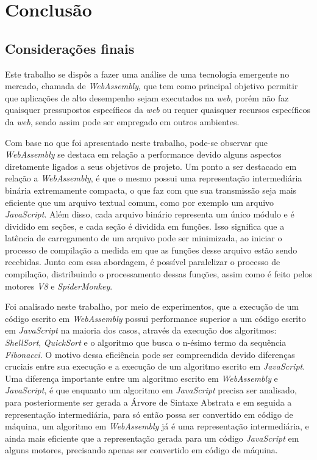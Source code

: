 \chapter{Conclusão}
\label{chap:conclusion}

\section{Considerações finais}
\label{ssec:final-considerations}

Este trabalho se dispôs a fazer uma análise de uma tecnologia emergente no mercado,
chamada de \textit{WebAssembly}, que tem como principal objetivo permitir que aplicações
de alto desempenho sejam executados na \textit{web}, porém não faz quaisquer pressupostos
específicos da \textit{web} ou requer quaisquer recursos específicos da \textit{web},
sendo assim pode ser empregado em outros ambientes.

Com base no que foi apresentado neste trabalho, pode-se observar que \textit{WebAssembly}
se destaca em relação a performance devido alguns aspectos diretamente ligados a seus
objetivos de projeto. Um ponto a ser destacado em relação a \textit{WebAssembly}, é que o
mesmo possui uma representação intermediária binária extremamente compacta, o que faz com
que sua transmissão seja mais eficiente que um arquivo textual comum, como por exemplo um
arquivo \textit{JavaScript}. Além disso, cada arquivo binário representa um único módulo
e é dividido em seções, e cada seção é dividida em funções. Isso significa que a latência
de carregamento de um arquivo pode ser minimizada, ao iniciar o processo de compilação a
medida em que as funções desse arquivo estão sendo recebidas. Junto com essa abordagem,
é possível paralelizar o processo de compilação, distribuindo o processamento dessas
funções, assim como é feito pelos motores \textit{V8} e \textit{SpiderMonkey}.

Foi analisado neste trabalho, por meio de experimentos, que a execução de um código
escrito em \textit{WebAssembly} possui performance superior a um código escrito em
\textit{JavaScript} na maioria dos casos, através da execução dos algoritmos:
\textit{ShellSort}, \textit{QuickSort} e o algoritmo que busca o n-ésimo termo da
sequência \textit{Fibonacci}. O motivo dessa eficiência pode ser compreendida devido
diferenças cruciais entre sua execução e a execução de um algoritmo escrito em
\textit{JavaScript}. Uma diferença importante entre um algoritmo escrito em
\textit{WebAssembly} e \textit{JavaScript}, é que enquanto um algoritmo em
\textit{JavaScript} precisa ser analisado, para posteriormente ser gerada a Árvore de
Sintaxe Abstrata e em seguida a representação intermediária, para só então possa ser
convertido em código de máquina, um algoritmo em \textit{WebAssembly} já é uma
representação intermediária, e ainda mais eficiente que a representação gerada para um
código \textit{JavaScript} em alguns motores, precisando apenas ser convertido em código
de máquina.

